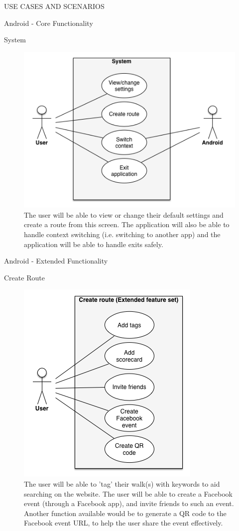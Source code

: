 \documentclass{article}
\begin{document}
\begin{section}{USE CASES AND SCENARIOS}
\begin{subsection}{Android - Core Functionality}
			\clearpage
			\begin{subsubsection}{System}
				\begin{figure}[h!]
					\begin{center}
						\includegraphics[height=0.55\columnwidth]{../Diagrams/UseCase/Android/Core/System.png}
					\end{center}
					\caption{The user will be able to view or change their default settings and create a route from this screen. The application will also be able to handle context switching (i.e. switching to another app) and the application will be able to handle exits safely.}
				\end{figure}
			\end{subsubsection}
		\end{subsection}
		
		\clearpage
		\begin{subsection}{Android - Extended Functionality}
			\begin{subsubsection}{Create Route}
				\begin{figure}[h!]
					\begin{center}
						\includegraphics[height=0.55\columnwidth]{../Diagrams/UseCase/Android/Extended/CreateRoute_Extended.png}
					\end{center}
					\caption{The user will be able to 'tag' their walk(s) with keywords to aid searching on the website. The user will be able to create a Facebook event (through a Facebook app), and invite friends to such an event. Another function available would be to generate a QR code to the Facebook event URL, to help the user share the event effectively.}
				\end{figure}
			\end{subsubsection}
			

\end{subsection}
\end{section}
\end{document}
